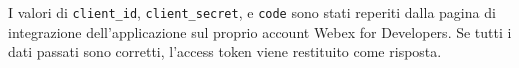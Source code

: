 \begin{enumerate}
    I valori di \texttt{client\_id}, \texttt{client\_secret}, e \texttt{code} sono stati reperiti dalla pagina di integrazione 
    dell'applicazione sul proprio account Webex for Developers.
    Se tutti i dati passati sono corretti, l'access token viene restituito come risposta.
 
\end{enumerate}